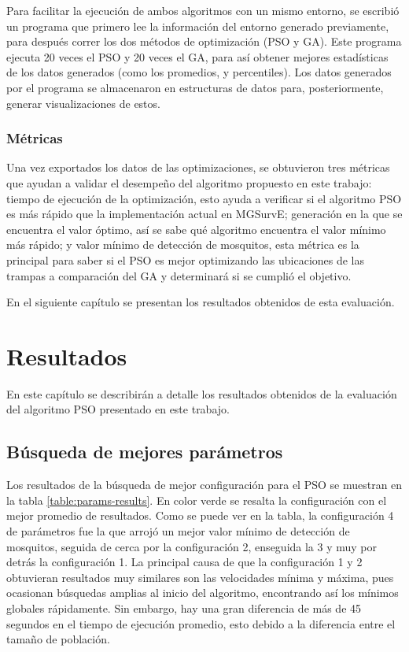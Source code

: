 \documentclass[letterpaper]{report}
\begin{document}
    Para facilitar la ejecución de ambos algoritmos con un mismo entorno, se
    escribió un programa que primero lee la información del entorno generado
    previamente, para después correr los dos métodos de optimización (PSO y
    GA). Este programa ejecuta 20 veces el PSO y 20 veces el GA, para así
    obtener mejores estadísticas de los datos generados (como los promedios, y
    percentiles). Los datos generados por el programa se almacenaron en
    estructuras de datos para, posteriormente, generar visualizaciones de estos.

    \subsection{Métricas}

    Una vez exportados los datos de las optimizaciones, se obtuvieron tres
    métricas que ayudan a validar el desempeño del algoritmo propuesto en este
    trabajo: tiempo de ejecución de la optimización, esto ayuda a verificar si
    el algoritmo PSO es más rápido que la implementación actual en MGSurvE;
    generación en la que se encuentra el valor óptimo, así se sabe qué algoritmo
    encuentra el valor mínimo más rápido; y valor mínimo de detección de
    mosquitos, esta métrica es la principal para saber si el PSO es mejor
    optimizando las ubicaciones de las trampas a comparación del GA y
    determinará si se cumplió el objetivo.

    En el siguiente capítulo se presentan los resultados obtenidos de esta
    evaluación.

\chapter{Resultados}\label{chap:resultados}
  En este capítulo se describirán a detalle los resultados obtenidos de la
  evaluación del algoritmo PSO presentado en este trabajo.

  \section{Búsqueda de mejores parámetros}\label{sect:busqueda-mejores-params}
    Los resultados de la búsqueda de mejor configuración para el PSO se muestran
    en la tabla \ref{table:params-results}. En color verde se resalta la
    configuración con el mejor promedio de resultados. Como se puede ver en la
    tabla, la configuración 4 de parámetros fue la que arrojó un mejor valor
    mínimo de detección de mosquitos, seguida de cerca por la configuración 2,
    enseguida la 3 y muy por detrás la configuración 1. La principal causa de
    que la configuración 1 y 2 obtuvieran resultados muy similares son las
    velocidades mínima y máxima, pues ocasionan búsquedas amplias al inicio del
    algoritmo, encontrando así los mínimos globales rápidamente. Sin embargo,
    hay una gran diferencia de más de 45 segundos en el tiempo de ejecución
    promedio, esto debido a la diferencia entre el tamaño de población.
\end{document}

